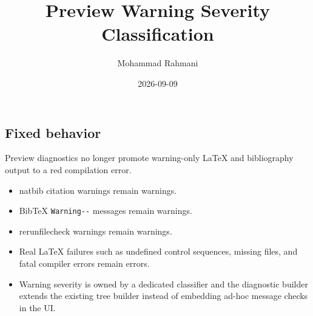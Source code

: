 \documentclass[a4paper]{article}
\title{Preview Warning Severity Classification}
\date{2026-09-09}
\author{Mohammad Rahmani}
\begin{document}
   \maketitle

   \begin{preview}
      \section{Fixed behavior}

      Preview diagnostics no longer promote warning-only LaTeX and bibliography
      output to a red compilation error.

      \begin{itemize}
         \item natbib citation warnings remain warnings.
         \item BibTeX \verb|Warning--| messages remain warnings.
         \item rerunfilecheck warnings remain warnings.
         \item Real LaTeX failures such as undefined control sequences, missing
         files, and fatal compiler errors remain errors.
         \item Warning severity is owned by a dedicated classifier and the
         diagnostic builder extends the existing tree builder instead of
         embedding ad-hoc message checks in the UI.
      \end{itemize}
   \end{preview}

   
   
\end{document}
